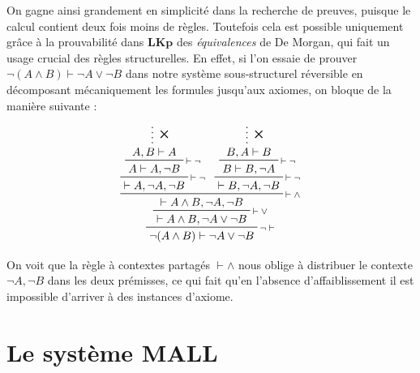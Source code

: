 \documentclass[11pt]{report}
\newcommand{\seq}{\vdash}
\newcommand{\irule}[1]{\footnotesize$#1$}
\newcommand{\iruleL}[1]{\irule{{#1}\seq}}
\newcommand{\iruleR}[1]{\irule{\seq{#1}}}
\begin{document}
On gagne ainsi grandement en simplicité dans la recherche de preuves, puisque le calcul contient deux fois moins de règles. Toutefois cela est possible uniquement grâce à la prouvabilité dans $\mathbf{LKp}$ des \emph{équivalences} de De Morgan, qui fait un usage crucial des règles structurelles. En effet, si l'on essaie de prouver $\neg (A \land B) \seq \neg A \lor \neg B$ dans notre système sous-structurel réversible en décomposant mécaniquement les formules jusqu'aux axiomes, on bloque de la manière suivante :

\begin{displaymath}
    \prftree[r]{\iruleL{\neg}}
        {\prftree[r]{\iruleR{\lor}}
            {\prftree[r]{\iruleR{\land}}
                {\prftree[r]{\iruleR{\neg}}
                    {\prftree[r]{\iruleR{\neg}}
                        {\prfsummary[\ding{53}]{A,B \seq A}}
                        {A \seq A,\neg B}}
                    {\seq A,\neg A,\neg B}}
                {\prftree[r]{\iruleR{\neg}}
                    {\prftree[r]{\iruleR{\neg}}
                        {\prfsummary[\ding{53}]{B,A \seq B}}
                        {B \seq B,\neg A}}
                    {\seq B,\neg A,\neg B}}
                {\seq A \land B,\neg A,\neg B}}
            {\seq A \land B,\neg A \lor \neg B}}
        {\neg (A \land B) \seq \neg A \lor \neg B}
\end{displaymath}

On voit que la règle à contextes partagés {\iruleR{\land}} nous oblige à distribuer le contexte $\neg A,\neg B$ dans les deux prémisses, ce qui fait qu'en l'absence d'affaiblissement il est impossible d'arriver à des instances d'axiome.

\section{Le système $\mathbf{MALL}$}
\end{document}
